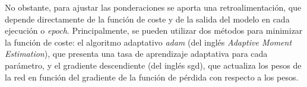 \vspace{3mm}

No obstante, para ajustar las ponderaciones se aporta una retroalimentación, que depende directamente de la función de coste y de la salida del modelo en cada ejecución o \textit{epoch}. Principalmente, se pueden utilizar dos métodos para minimizar la función de coste: el algoritmo adaptativo \textit{adam} (del inglés \textit{Adaptive Moment Estimation}), que presenta una tasa de aprendizaje adaptativa para cada parámetro, y el gradiente descendiente (del inglés \gls{sgd}), que actualiza los pesos de la red en función del gradiente de la función de pérdida con respecto a los pesos. \cite{ibmann}

